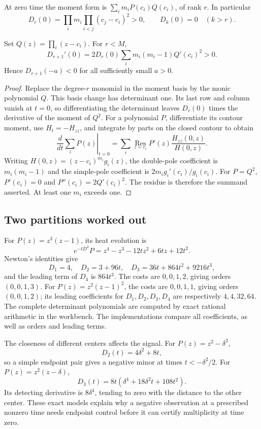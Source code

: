 At zero time the moment form is $\sum_i m_iP(c_i)Q(c_i)$, of rank $r$. In particular
\[
 D_r(0)=\prod_i m_i\prod_{i<j}(c_j-c_i)^2>0,
 \qquad D_k(0)=0\quad(k>r).
\]
\begin{proposition}\label{prop:first-negative}
Set $Q(z)=\prod_i(z-c_i)$. For $r<M$,
\[
 D_{r+1}'(0)=2D_r(0)\sum_i m_i(m_i-1)Q'(c_i)^2>0.
\]
Hence $D_{r+1}(-a)<0$ for all sufficiently small $a>0$.
\end{proposition}
\begin{proof}
Replace the degree-$r$ monomial in the moment basis by the monic polynomial $Q$. This basis change has determinant one. Its last row and column vanish at $t=0$, so differentiating the determinant leaves $D_r(0)$ times the derivative of the moment of $Q^2$. For a polynomial $P$, differentiate its contour moment, use $H_t=-H_{zz}$, and integrate by parts on the closed contour to obtain
\[
 \left.\frac d{dt}\sum_zP(z)\right|_{t=0}
 =\sum_i\operatorname*{Res}_{z=c_i}
      P'(z)\frac{H_{zz}(0,z)}{H(0,z)}.
\]
Writing $H(0,z)=(z-c_i)^{m_i}g_i(z)$, the double-pole coefficient is $m_i(m_i-1)$ and the simple-pole coefficient is $2m_i g_i'(c_i)/g_i(c_i)$. For $P=Q^2$, $P'(c_i)=0$ and $P''(c_i)=2Q'(c_i)^2$. The residue is therefore the summand asserted. At least one $m_i$ exceeds one.
\end{proof}

\subsection{Two partitions worked out}
For $P(z)=z^3(z-1)$, its heat evolution is
\[
 e^{-tD^2}P=z^4-z^3-12tz^2+6tz+12t^2.
\]
Newton's identities give
\[
 D_1=4,\quad D_2=3+96t,\quad
 D_3=36t+864t^2+9216t^3,
\]
and the leading term of $D_4$ is $864t^3$. The costs are $0,0,1,2$, giving orders $(0,0,1,3)$. For $P(z)=z^2(z-1)^2$, the costs are $0,0,1,1$, giving orders $(0,0,1,2)$; its leading coefficients for $D_1,D_2,D_3,D_4$ are respectively $4,4,32,64$. The complete determinant polynomials are computed by exact rational arithmetic in the workbench. The implementations compare all coefficients, as well as orders and leading terms.

The closeness of different centers affects the signal. For $P(z)=z^2-\delta^2$,
\[
 D_2(t)=4\delta^2+8t,
\]
so a simple endpoint pair gives a negative minor at times $t<-\delta^2/2$. For $P(z)=z^2(z-\delta)$,
\[
 D_3(t)=8t(\delta^4+18\delta^2t+108t^2).
\]
Its detecting derivative is $8\delta^4$, tending to zero with the distance to the other center. These exact models explain why a negative observation at a prescribed nonzero time needs endpoint control before it can certify multiplicity at time zero.

